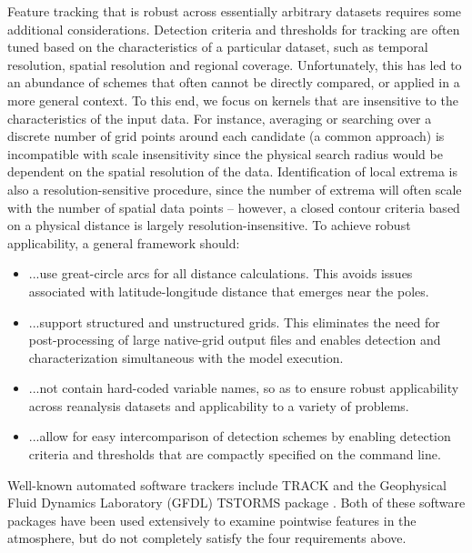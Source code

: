\documentclass[gmdd, hvmath]{copernicus}
\begin{document}
Feature tracking that is robust across essentially arbitrary datasets requires some additional considerations.  Detection criteria and thresholds for tracking are often tuned based on the characteristics of a particular dataset, such as temporal resolution, spatial resolution and regional coverage.  Unfortunately, this has led to an abundance of schemes that often cannot be directly compared, or applied in a more general context.  To this end, we focus on kernels that are insensitive to the characteristics of the input data. For instance, averaging or searching over a discrete number of grid points around each candidate (a common approach) is incompatible with scale insensitivity since the physical search radius would be dependent on the spatial resolution of the data.  Identification of local extrema is also a resolution-sensitive procedure, since the number of extrema will often scale with the number of spatial data points -- however, a closed contour criteria based on a physical distance is largely resolution-insensitive.  To achieve robust applicability, a general framework should:
\begin{itemize}
\item[] ...use great-circle arcs for all distance calculations.  This avoids issues associated with latitude-longitude distance that emerges near the poles.
\item[] ...support structured and unstructured grids.  This eliminates the need for post-processing of large native-grid output files and enables detection and characterization simultaneous with the model execution.
\item[] ...not contain hard-coded variable names, so as to ensure robust applicability across reanalysis datasets and applicability to a variety of problems.
\item[] ...allow for easy intercomparison of detection schemes by enabling detection criteria and thresholds that are compactly specified on the command line.
\end{itemize}  Well-known automated software trackers include TRACK \citep{hodges1994general, hodges1995feature, hodges2015track} and the Geophysical Fluid Dynamics Laboratory (GFDL) TSTORMS package \citep{vitart1997simulation, zhao2009simulations}.  Both of these software packages have been used extensively to examine pointwise features in the atmosphere, but do not completely satisfy the four requirements above.

\end{document}
